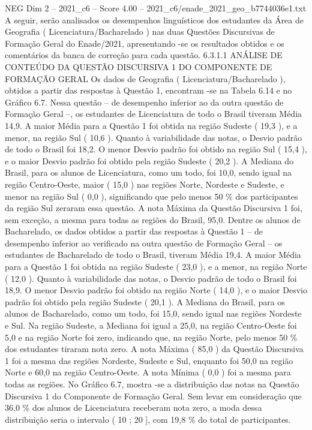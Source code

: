 \begin{textsample}{NEG Dim 2 – 2021\_c6 – Score 4.00 – 2021\_c6/enade\_2021\_geo\_b7744036e1.txt}
A seguir, serão analisados os desempenhos linguísticos dos estudantes da Área de Geografia ( Licenciatura/Bacharelado ) nas duas Questões Discursivas de Formação Geral do Enade/2021, apresentando -se os resultados obtidos e os comentários da banca de correção para cada questão. 6.3.1.1 ANÁLISE DE CONTEÚDO DA QUESTÃO DISCURSIVA 1 DO COMPONENTE DE FORMAÇÃO GERAL Os dados de Geografia ( Licenciatura/Bacharelado ), obtidos a partir das respostas à Questão 1, encontram -se na Tabela 6.14 e no Gráfico 6.7.
Nessa questão – de desempenho inferior ao da outra questão de Formação Geral –, os estudantes de Licenciatura de todo o Brasil tiveram Média 14,9.
A maior Média para a Questão 1 foi obtida na região Sudeste ( 19,3 ), e a menor, na região Sul ( 10,6 ).
Quanto à variabilidade das notas, o Desvio padrão de todo o Brasil foi 18,2.
O menor Desvio padrão foi obtido na região Sul ( 15,4 ), e o maior Desvio padrão foi obtido pela região Sudeste ( 20,2 ).
A Mediana do Brasil, para os alunos de Licenciatura, como um todo, foi 10,0, sendo igual na região Centro-Oeste, maior ( 15,0 ) nas regiões Norte, Nordeste e Sudeste, e menor na região Sul ( 0,0 ), significando que pelo menos 50 \% dos participantes da região Sul zeraram essa questão.
A nota Máxima da Questão Discursiva 1 foi, sem exceção, a mesma para todas as regiões do Brasil, 95,0.
Dentre os alunos de Bacharelado, os dados obtidos a partir das respostas à Questão 1 – de desempenho inferior ao verificado na outra questão de Formação Geral – os estudantes de Bacharelado de todo o Brasil, tiveram Média 19,4.
A maior Média para a Questão 1 foi obtida na região Sudeste ( 23,0 ), e a menor, na região Norte ( 12,0 ).
Quanto à variabilidade das notas, o Desvio padrão de todo o Brasil foi 18,9.
O menor Desvio padrão foi obtido na região Norte ( 14,0 ), e o maior Desvio padrão foi obtido pela região Sudeste ( 20,1 ).
A Mediana do Brasil, para os alunos de Bacharelado, como um todo, foi 15,0, sendo igual nas regiões Nordeste e Sul.
Na região Sudeste, a Mediana foi igual a 25,0, na região Centro-Oeste foi 5,0 e na região Norte foi zero, indicando que, na região Norte, pelo menos 50 \% dos estudantes tiraram nota zero.
A nota Máxima ( 85,0 ) da Questão Discursiva 1 foi a mesma das regiões Nordeste, Sudeste e Sul, enquanto foi 50,0 na região Norte e 60,0 na região Centro-Oeste.
A nota Mínima ( 0,0 ) foi a mesma para todas as regiões.
No Gráfico 6.7, mostra -se a distribuição das notas na Questão Discursiva 1 do Componente de Formação Geral.
Sem levar em consideração que 36,0 \% dos alunos de Licenciatura receberam nota zero, a moda dessa distribuição seria o intervalo ( 10 ; 20 ], com 19,8 \% do total de participantes.

\end{textsample}

